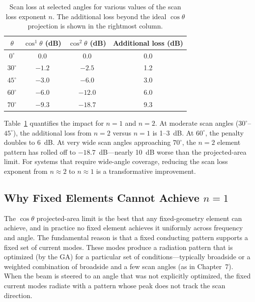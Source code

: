 \begin{table}
\begin{center}
\caption[Scan loss vs.\ exponent $n$ at selected angles]{Scan loss at selected angles for various values of the scan loss exponent $n$.  The additional loss beyond the ideal $\cos\theta$ projection is shown in the rightmost column.}
\label{tab:RCA_scanloss}
\begin{tabular}{cccc}
\hline
$\theta$ & $\cos^1\theta$ (dB) & $\cos^2\theta$ (dB) & Additional loss (dB) \\
\hline
$0^{\circ}$  & 0.0 & 0.0 & 0.0 \\
$30^{\circ}$ & $-1.2$ & $-2.5$ & 1.2 \\
$45^{\circ}$ & $-3.0$ & $-6.0$ & 3.0 \\
$60^{\circ}$ & $-6.0$ & $-12.0$ & 6.0 \\
$70^{\circ}$ & $-9.3$ & $-18.7$ & 9.3 \\
\hline
\end{tabular}
\end{center}
\end{table}

Table~\ref{tab:RCA_scanloss} quantifies the impact for $n = 1$ and $n = 2$.  At moderate scan angles ($30^{\circ}$--$45^{\circ}$), the additional loss from $n = 2$ versus $n = 1$ is 1--3~dB.  At $60^{\circ}$, the penalty doubles to 6~dB.  At very wide scan angles approaching $70^{\circ}$, the $n = 2$ element pattern has rolled off to $-18.7$~dB---nearly 10~dB worse than the projected-area limit.  For systems that require wide-angle coverage, reducing the scan loss exponent from $n \approx 2$ to $n \approx 1$ is a transformative improvement.

\subsection{Why Fixed Elements Cannot Achieve $n = 1$}

The $\cos\theta$ projected-area limit is the best that any fixed-geometry element can achieve, and in practice no fixed element achieves it uniformly across frequency and angle.  The fundamental reason is that a fixed conducting pattern supports a fixed set of current modes.  These modes produce a radiation pattern that is optimized (by the GA) for a particular set of conditions---typically broadside or a weighted combination of broadside and a few scan angles (as in Chapter~7).  When the beam is steered to an angle that was not explicitly optimized, the fixed current modes radiate with a pattern whose peak does not track the scan direction.

